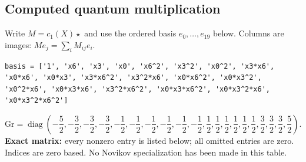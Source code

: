 \documentclass[10pt,a4paper]{article}
\begin{document}
\subsection*{Computed quantum multiplication}
Write $M=c_1(X)\star$ and use the ordered basis $e_0,\ldots,e_{19}$ below. Columns are images: $M e_j=\sum_i M_{ij}e_i$.
\begin{lstlisting}
basis = ['1', 'x6', 'x3', 'x0', 'x6^2', 'x3^2', 'x0^2', 'x3*x6', 'x0*x6', 'x0*x3', 'x3*x6^2', 'x3^2*x6', 'x0*x6^2', 'x0*x3^2', 'x0^2*x6', 'x0*x3*x6', 'x3^2*x6^2', 'x0*x3*x6^2', 'x0*x3^2*x6', 'x0*x3^2*x6^2']
\end{lstlisting}
\[\mathrm{Gr}=\operatorname{diag}\!\left(- \frac{5}{2},- \frac{3}{2},- \frac{3}{2},- \frac{3}{2},- \frac{1}{2},- \frac{1}{2},- \frac{1}{2},- \frac{1}{2},- \frac{1}{2},- \frac{1}{2},\frac{1}{2},\frac{1}{2},\frac{1}{2},\frac{1}{2},\frac{1}{2},\frac{1}{2},\frac{3}{2},\frac{3}{2},\frac{3}{2},\frac{5}{2}\right).\]
\textbf{Exact matrix:} every nonzero entry is listed below; all omitted entries are zero. Indices are zero based. No Novikov specialization has been made in this table.
\end{document}
